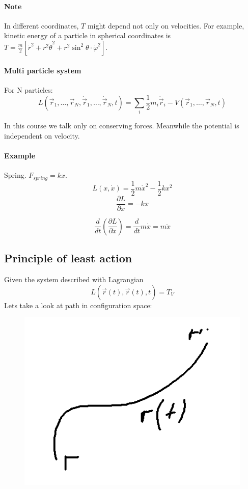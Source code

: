 \paragraph{Note} In different coordinates, $T$ might depend not only on velocities. For example, kinetic energy of a particle in spherical coordinates is $T = \frac{m}{2}\left[\dot{r}^2 + r^2\dot{\theta}^2 + r^2 \sin^2 \theta \cdot \dot{\varphi}^2 \right]$.

\paragraph{Multi particle system} For N particles:
$$L(\vec{r}_1,\dots, \vec{r}_N, \dot{\vec{r}}_1,\dots, \dot{\vec{r}}_N,t) = \sum_i \frac{1}{2} m_i \dot{\vec{r}}_i - V(\vec{r}_1,\dots, \vec{r}_N, t)$$

In this course we talk only on conserving forces. Meanwhile the potential is independent on velocity.

\paragraph{Example} Spring. $F_{spring} = kx$.
$$L(x, \dot{x}) = \frac{1}{2}m\dot{x}^2 - \frac{1}{2}kx^2$$
$$\frac{\partial L}{\partial x} = -kx$$

$$\frac{d}{dt}\left(\frac{\partial L}{\partial \dot{x}}\right) = \frac{d}{dt} m\dot{x} = m\ddot{x}$$

\subsection{Principle of least action}
Given the system described with Lagrangian
$$L(\vec{r}(t), \dot{\vec{r}}(t),t)= T_V$$
Lets take a look at path in configuration space:  \begin{figure}
	\includegraphics[width=\linewidth]{./lect1/2.png}
\end{figure}

